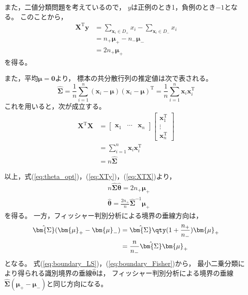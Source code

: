 \documentclass[class=jsarticle, crop=false, dvipdfmx, fleqn]{standalone}
\begin{document}
また，二値分類問題を考えているので，
\(y\)は正例のとき1，負例のとき\(-1\)となる。
このことから，
\begin{align}
	\bm{X}^\mathrm{T} \bm{y}
		& = \sum_{\bm{x}_i \in D_+} x_i - \sum_{\bm{x}_i \in D_-} x_i \\
		& = n_+ \bm{\mu}_+ - n_- \bm{\mu}_- \\
		& = 2 n_+ \bm{\mu}_+
	\label{eq:XTy}
\end{align}
を得る。

また，平均\(\bm{\mu} = \bm{0}\)より，
標本の共分散行列の推定値は次で表される。
\begin{equation}
	\hat{\bm{\Sigma}}
		= \frac{1}{n} \sum_{i=1}^{n} (\bm{x}_i - \bm{\mu}) (\bm{x}_i - \bm{\mu})^\mathrm{T}
		= \frac{1}{n} \sum_{i=1}^{n} \bm{x}_i \bm{x}_i^\mathrm{T}
\end{equation}
これを用いると，次が成立する。
\begin{align}
	\bm{X}^\mathrm{T} \bm{X}
		& =
			\begin{bmatrix}
				\bm{x}_1 & \cdots & \bm{x}_n
			\end{bmatrix}
			\begin{bmatrix}
				\bm{x}_1^\mathrm{T} \\ \vdots \\ \bm{x}_n^\mathrm{T}
			\end{bmatrix} \\
		& = \sum_{i=1}^{n} \bm{x}_i \bm{x}_i^\mathrm{T} \\
		& = n \hat{\bm{\Sigma}}
	\label{eq:XTX}
\end{align}

以上，式(\ref{eq:theta_opt})，(\ref{eq:XTy})，(\ref{eq:XTX})より，
\begin{align}
	& n \hat{\bm{\Sigma}} \hat{\bm{\theta}} = 2 n_+ \bm{\mu}_+ \\
	& \hat{\bm{\theta}} = \frac{2 n_+}{n} \hat{\bm{\Sigma}}^{-1} \bm{\mu}_+
	\label{eq:boundary_LS}
\end{align}
を得る。
一方，フィッシャー判別分析による境界の垂線方向は，
\begin{align}
	\hat{\bm{\Sigma}} (\bm{\mu}_+ - \bm{\mu}_-)
		& = \hat{\bm{\Sigma}} \qty(1 + \frac{n_+}{n_-}) \bm{\mu}_+ \\
		& = \frac{n}{n_-} \hat{\bm{\Sigma}} \bm{\mu}_+
	\label{eq:boundary_Fisher}
\end{align}
となる。
式(\ref{eq:boundary_LS})，(\ref{eq:boundary_Fisher})から，
最小二乗分類により得られる識別境界の垂線\(\hat{\bm{\theta}}\)は，
フィッシャー判別分析による境界の垂線\(\hat{\bm{\Sigma}} (\bm{\mu}_+ - \bm{\mu}_-)\)と同じ方向になる。
\end{document}
